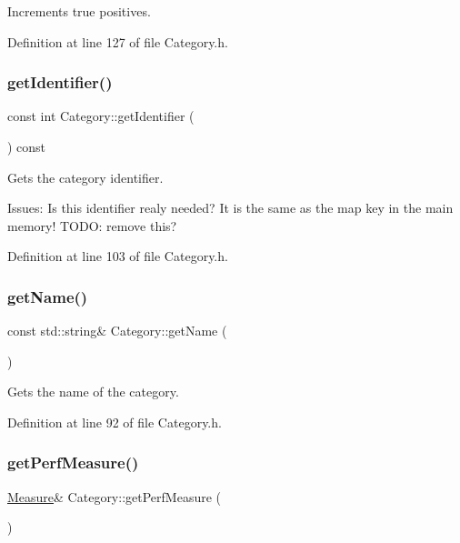 Increments true positives. 

Definition at line 127 of file Category.\+h.

\mbox{\label{class_category_aad52cad1dde01976b9ee2fba33fb3661}} 
\subsubsection{\texorpdfstring{get\+Identifier()}{getIdentifier()}}
{\footnotesize\ttfamily const int Category\+::get\+Identifier (\begin{DoxyParamCaption}{ }\end{DoxyParamCaption}) const\hspace{0.3cm}{\ttfamily [inline]}}

Gets the category identifier.

Issues\+: Is this identifier realy needed? It is the same as the map key in the main memory! T\+O\+DO\+: remove this? 

Definition at line 103 of file Category.\+h.

\mbox{\label{class_category_a23af5ca47bddcf85828a835ae188ed1f}} 
\subsubsection{\texorpdfstring{get\+Name()}{getName()}}
{\footnotesize\ttfamily const std\+::string\& Category\+::get\+Name (\begin{DoxyParamCaption}{ }\end{DoxyParamCaption})\hspace{0.3cm}{\ttfamily [inline]}}

Gets the name of the category. 

Definition at line 92 of file Category.\+h.

\mbox{\label{class_category_a4752e892d1b8b078bfd4d9e1c13f8082}} 
\subsubsection{\texorpdfstring{get\+Perf\+Measure()}{getPerfMeasure()}}
{\footnotesize\ttfamily \hyperlink{class_measure}{Measure}\& Category\+::get\+Perf\+Measure (\begin{DoxyParamCaption}{ }\end{DoxyParamCaption})\hspace{0.3cm}{\ttfamily [inline]}}

